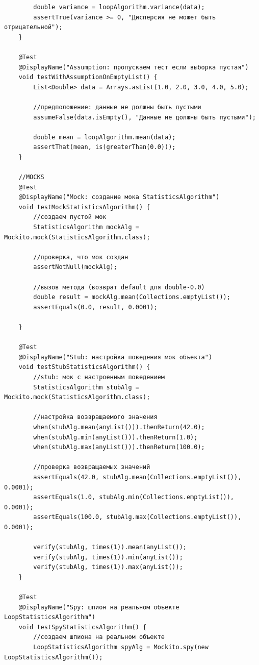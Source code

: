 \begin{verbatim}
        double variance = loopAlgorithm.variance(data);
        assertTrue(variance >= 0, "Дисперсия не может быть отрицательной");
    }

    @Test
    @DisplayName("Assumption: пропускаем тест если выборка пустая")
    void testWithAssumptionOnEmptyList() {
        List<Double> data = Arrays.asList(1.0, 2.0, 3.0, 4.0, 5.0);

        //предположение: данные не должны быть пустыми
        assumeFalse(data.isEmpty(), "Данные не должны быть пустыми");

        double mean = loopAlgorithm.mean(data);
        assertThat(mean, is(greaterThan(0.0)));
    }

    //MOCKS
    @Test
    @DisplayName("Mock: создание мока StatisticsAlgorithm")
    void testMockStatisticsAlgorithm() {
        //создаем пустой мок
        StatisticsAlgorithm mockAlg = Mockito.mock(StatisticsAlgorithm.class);

        //проверка, что мок создан
        assertNotNull(mockAlg);

        //вызов метода (возврат default для double-0.0)
        double result = mockAlg.mean(Collections.emptyList());
        assertEquals(0.0, result, 0.0001);

    }

    @Test
    @DisplayName("Stub: настройка поведения мок объекта")
    void testStubStatisticsAlgorithm() {
        //stub: мок с настроенным поведением
        StatisticsAlgorithm stubAlg = Mockito.mock(StatisticsAlgorithm.class);

        //настройка возвращаемого значения
        when(stubAlg.mean(anyList())).thenReturn(42.0);
        when(stubAlg.min(anyList())).thenReturn(1.0);
        when(stubAlg.max(anyList())).thenReturn(100.0);

        //проверка возвращаемых значений
        assertEquals(42.0, stubAlg.mean(Collections.emptyList()), 0.0001);
        assertEquals(1.0, stubAlg.min(Collections.emptyList()), 0.0001);
        assertEquals(100.0, stubAlg.max(Collections.emptyList()), 0.0001);

        verify(stubAlg, times(1)).mean(anyList());
        verify(stubAlg, times(1)).min(anyList());
        verify(stubAlg, times(1)).max(anyList());
    }

    @Test
    @DisplayName("Spy: шпион на реальном объекте LoopStatisticsAlgorithm")
    void testSpyStatisticsAlgorithm() {
        //создаем шпиона на реальном объекте
        LoopStatisticsAlgorithm spyAlg = Mockito.spy(new LoopStatisticsAlgorithm());


\end{verbatim}
